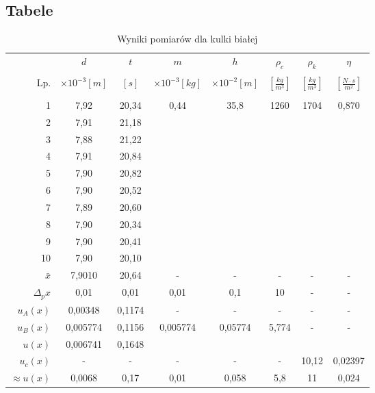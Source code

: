 \documentclass[polish, 11pt, a4paper]{article}
\begin{document}
	\subsection{Tabele}
		\begin{table}[H]
			\centering
			\caption{Wyniki pomiarów dla kulki białej}
			\begin{tabular}{|r|c|c|c|c|c|c|c|} \hline
				&	\(d\)	&	\(t\)	&	\(m\)	&	\(h\)	&	\(\rho_c\)	&	\(\rho_k\)	&	\(\eta\)	\\
				&&&&&&& \\[-1em]
				
			Lp.	&	\(\times{10^{-3} [m]}\)	&	\([s]\)	&	\(\times{10^{-3} [kg]}\)	&	\(\times{10^{-2} [m]}\)	&	\(\left[\frac{kg}{m^3}\right]\)	&	\(\left[\frac{kg}{m^3}\right]\)	&	\(\left[\frac{N\cdot s}{m^2}\right]\)	\\
			&&&&&&& \\[-1em]
			\hline
			1	&	7,92	&	20,34	&	\multirow{10}{*}{0,44}	&	\multirow{10}{*}{35,8}	&	\multirow{10}{*}{1260}	&	\multirow{10}{*}{1704}	&	\multirow{10}{*}{0,870}	\\\cline{1-3}
			2	&	7,91	&	21,18	&		&		&		&		&		\\\cline{1-3}
			3	&	7,88	&	21,22	&		&		&		&		&		\\\cline{1-3}
			4	&	7,91	&	20,84	&		&		&		&		&		\\\cline{1-3}
			5	&	7,90	&	20,82	&		&		&		&		&		\\\cline{1-3}
			6	&	7,90	&	20,52	&		&		&		&		&		\\\cline{1-3}
			7	&	7,89	&	20,60	&		&		&		&		&		\\\cline{1-3}
			8	&	7,90	&	20,34	&		&		&		&		&		\\\cline{1-3}
			9	&	7,90	&	20,41	&		&		&		&		&		\\\cline{1-3}
			10	&	7,90	&	20,10	&		&		&		&		&		\\\hline
			\(\bar{x}\)	&	7,9010	&	20,64	&	-	&	-	&	-	&	-	&	-	\\\hline
			\(\Delta{_px}\)	&	0,01	&	0,01	&	0,01	&	0,1	&	10	&	-	&	-	\\\hline
			\(u_A(x)\)	&	0,00348	&	0,1174	&	-	&	-	&	-	&	-	&	-	\\\hline
			\(u_B(x)\)	&	0,005774	&	0,1156	&	\multirow{2}{*}{0,005774}	&	\multirow{2}{*}{0,05774}	&	\multirow{2}{*}{5,774}	&	\multirow{2}{*}{-}	&	\multirow{2}{*}{-}	\\\cline{1-3}
			\(u(x)\)	&	0,006741	&	0,1648	&		&		&		&		&		\\\hline
			\(u_c(x)\)	&	-	&	-	&	-	&	-	&	-	&	10,12	&	0,02397	\\\hline
			\(\approx{u(x)}\)	&	0,0068	&	0,17	&	0,01	&	0,058	&	5,8	&	11	&	0,024	\\\hline
			\end{tabular}
		\end{table}
	
\end{document}
